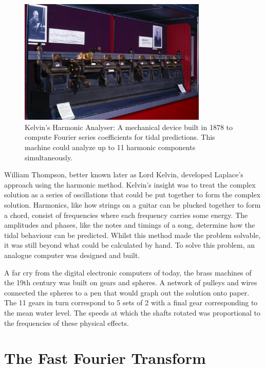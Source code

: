 \documentclass{book}
\begin{document}
\begin{figure}[ht!]
    \centering
    \includegraphics[width=0.8\textwidth]{Images/KelvinHarmonicAnalyser.jpg}
    \caption{Kelvin's Harmonic Analyser: A mechanical device built in 1878 to compute Fourier series coefficients for tidal predictions. This machine could analyze up to 11 harmonic components simultaneously.}
    \label{fig:kelvin_analyser}
\end{figure}

William Thompson, better known later as Lord Kelvin, developed Laplace's approach using the harmonic method. Kelvin's insight was to treat the complex solution as a series of oscillations that could be put together to form the complex solution. Harmonics, like how strings on a guitar can be plucked together to form a chord, consist of frequencies where each frequency carries some energy. The amplitudes and phases, like the notes and timings of a song, determine how the tidal behaviour can be predicted. Whilst this method made the problem solvable, it was still beyond what could be calculated by hand. To solve this problem, an analogue computer was designed and built.


A far cry from the digital electronic computers of today, the brass machines of the 19th century was built on gears and spheres. A network of pulleys and wires connected the spheres to a pen that would graph out the solution onto paper. The 11 gears in turn correspond to 5 sets of 2 with a final gear corresponding to the mean water level. The speeds at which the shafts rotated was proportional to the frequencies of these physical effects. 

\section{The Fast Fourier Transform}
\end{document}
